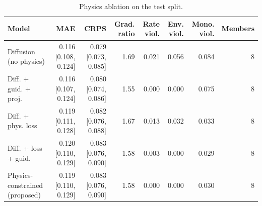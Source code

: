 \begin{table}[t]
\centering
\caption{Physics ablation on the test split.}
\label{tab:ablation}
\scriptsize
\begin{tabular}{lrrrrrrr}
\hline
Model & MAE & CRPS & Grad. ratio & Rate viol. & Env. viol. & Mono. viol. & Members \\
\hline
Diffusion (no physics) & 0.116 [0.108, 0.124] & 0.079 [0.073, 0.085] & 1.69 & 0.021 & 0.056 & 0.084 & 8 \\
Diff. + guid. + proj. & 0.116 [0.107, 0.124] & 0.080 [0.074, 0.086] & 1.55 & 0.000 & 0.000 & 0.075 & 8 \\
Diff. + phys. loss & 0.119 [0.111, 0.128] & 0.082 [0.076, 0.088] & 1.67 & 0.013 & 0.032 & 0.033 & 8 \\
Diff. + loss + guid. & 0.120 [0.110, 0.129] & 0.083 [0.076, 0.090] & 1.58 & 0.003 & 0.000 & 0.029 & 8 \\
Physics-constrained (proposed) & 0.119 [0.110, 0.129] & 0.083 [0.076, 0.090] & 1.58 & 0.000 & 0.000 & 0.030 & 8 \\
\hline
\end{tabular}
\end{table}
